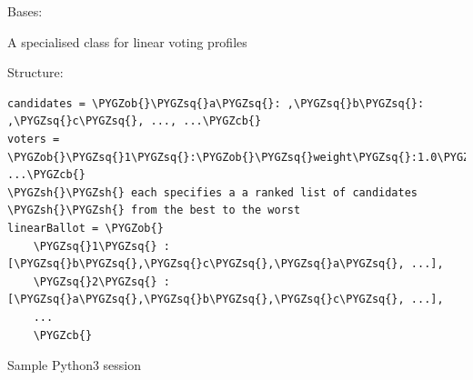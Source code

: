 \documentclass[letterpaper,10pt,english]{sphinxmanual}
\def\PYGZob{\char`\{}
\def\PYGZcb{\char`\}}
\def\PYGZsh{\char`\#}
\def\PYGZsq{\char`\'}
\begin{document}
\begin{fulllineitems}
\label{techDoc:votingDigraphs.LinearVotingProfile}
Bases: {\hyperref[techDoc:votingDigraphs.VotingProfile]{}}

A specialised class for linear voting profiles

Structure:

\begin{Verbatim}[commandchars=\\\{\}]
candidates = \PYGZob{}\PYGZsq{}a\PYGZsq{}: ,\PYGZsq{}b\PYGZsq{}:  ,\PYGZsq{}c\PYGZsq{}, ..., ...\PYGZcb{}
voters = \PYGZob{}\PYGZsq{}1\PYGZsq{}:\PYGZob{}\PYGZsq{}weight\PYGZsq{}:1.0\PYGZcb{},\PYGZsq{}2\PYGZsq{}:\PYGZob{}\PYGZsq{}weight\PYGZsq{}:1.0\PYGZcb{}, ...\PYGZcb{}
\PYGZsh{}\PYGZsh{} each specifies a a ranked list of candidates
\PYGZsh{}\PYGZsh{} from the best to the worst
linearBallot = \PYGZob{}
    \PYGZsq{}1\PYGZsq{} : [\PYGZsq{}b\PYGZsq{},\PYGZsq{}c\PYGZsq{},\PYGZsq{}a\PYGZsq{}, ...],
    \PYGZsq{}2\PYGZsq{} : [\PYGZsq{}a\PYGZsq{},\PYGZsq{}b\PYGZsq{},\PYGZsq{}c\PYGZsq{}, ...],
    ...
    \PYGZcb{}
\end{Verbatim}

Sample Python3 session


\end{fulllineitems}
\end{document}
